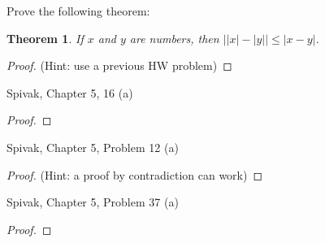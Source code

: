 \documentclass{article} %
\theoremstyle{plain}
\newtheorem*{theorem*}{Theorem}
\theoremstyle{definition}
\newcommand{\abs}[1]{\left\lvert #1 \right\rvert} %
\begin{document}
\noindent{} Prove the following theorem: 

\begin{theorem*} If $x$ and $y$ are numbers, then $\abs{\abs{x}-\abs{y}} \leq \abs{x-y}$. 
\end{theorem*}

\begin{proof} (Hint: use a previous HW problem)

\end{proof} 


\noindent{} Spivak, Chapter 5,  16 (a)

\begin{proof} 

\end{proof} 

\noindent{} Spivak, Chapter 5, Problem 12 (a) 

\begin{proof} (Hint: a proof by contradiction can work)

\end{proof} 


\noindent{} Spivak, Chapter 5, Problem 37 (a) 

\begin{proof} 

\end{proof} 




    





    
    
\end{document}
